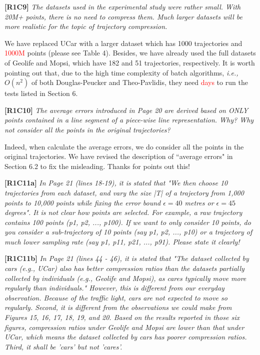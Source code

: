 \documentclass{letter}
\newcommand{\ie}{\emph{i.e.,}\xspace}
\begin{document}
\textbf{[R1C9]} \emph{ The datasets used in the experimental study were rather small. With 20M+ points, there is no need to compress them. Much larger datasets will be more realistic for the topic of trajectory compression.  }

We have replaced UCar with a larger dataset which has 1000 trajectories and \textcolor{red}{1000M} points (please see Table 4). Besides, we have already used the full datasets of Geolife and Mopsi, which have 182 and 51 trajectories, respectively.
It is worth pointing out that, due to the high time complexity of batch algorithms, \ie $O(n^2)$ of both Douglas-Peucker and Theo-Pavlidis, they need \textcolor{red}{days} to run the tests listed in Section 6. 

\textbf{[R1C10]} \emph{The average errors introduced in Page 20 are derived based on ONLY points contained in a line segment of a piece-wise line representation. Why? Why not consider all the points in the original trajectories? }

Indeed, when calculate the average errors, we do consider all the points in the original trajectories. We have revised the description of ``average errors" in Section 6.2 to fix the misleading. Thanks for points out this!


\textbf{[R1C11a]} \emph{ In Page 21 (lines 18-19), it is stated that "We then choose 10 trajectories from each dataset, and vary the size |T| of a trajectory from 1,000 points to 10,000 points while fixing the error bound $\epsilon = 40$ metres or $\epsilon = 45$ degrees". It is not clear how points are selected. For example, a raw trajectory contains 100 points (p1, p2, ..., p100). If we want to only consider 10 points, do you consider a sub-trajectory of 10 points (say p1, p2, ..., p10) or a trajectory of much lower sampling rate (say p1, p11, p21, ..., p91). Please state it clearly!}

\textbf{[R1C11b]} \emph{ In Page 21 (lines 44 - 46), it is stated that "The dataset collected by cars (e.g., UCar) also has better compression ratios than the datasets partially collected by individuals (e.g., Geolife and Mopsi), as cares typically move more regularly than individuals." However, this is different from our everyday observation. Because of the traffic light, cars are not expected to move so regularly. Second, it is different from the observations we could make from Figures 15, 16, 17, 18, 19, and 20. Based on the results reported in those six figures, compression ratios under Geolife and Mopsi are lower than that under UCar, which means the dataset collected by cars has poorer compression ratios. Third, it shall be 'cars' but not 'cares'. }
\end{document}
